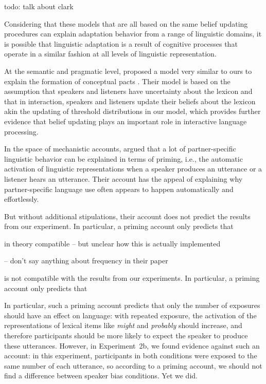 \documentclass[man, floatsintext]{apa6}
\begin{document}
todo: talk about clark

Considering that these models that are all based on the same belief updating procedures can explain adaptation behavior 
from a range of linguistic domains, it is possible that linguistic adaptation is a result of cognitive processes that operate in 
a similar fashion at all levels of linguistic representation. 

At the semantic and pragmatic level, \textcite{Hawkins2017} proposed a model 
very similar to ours to explain the formation of conceptual pacts \parencite{Clark1986}. 
Their model is based on the assumption that speakers and listeners have uncertainty 
about the lexicon \parencite[see also][]{Bergen2016} and that in interaction, speakers 
and listeners update their beliefs about the lexicon akin the updating of threshold distributions 
in our model, which provides further evidence that belief updating plays an important role in interactive language processing.

In the space of mechanistic accounts, \textcite{Pickering2004} argued that a lot of partner-specific linguistic behavior
 can be explained in terms of priming, i.e., the automatic activation of linguistic representations when 
a speaker produces an utterance or a listener hears an utterance. Their account has the appeal
of explaining why partner-specific language use often appears to happen automatically and effortlessly. 



But
without additional stipulations, their account does not predict the results from our experiment. In particular,
a priming account only predicts that 

in theory compatible -- but unclear how this is actually implemented

-- don't say anything about frequency in their paper


 is not compatible with the results from our 
experiments. In particular, a priming account only predicts that 


In particular, such a priming account predicts that only the number of exposures should have
an effect on language: with repeated exposure, the activation of the 
representations of lexical items like \textit{might} and \textit{probably} should increase, 
and therefore participants should be more likely to expect the speaker to produce these utterances.
However, in Experiment~2b, we found evidence against such an account: in this experiment,
participants in both conditions were exposed to the same number of each utterance, so according to
a priming account, we should not find a difference between speaker bias conditions. Yet we did. 
\end{document}
